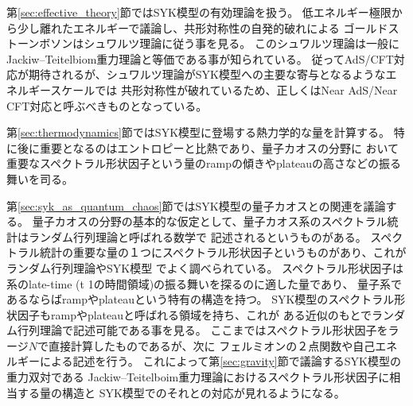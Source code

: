 第\ref{sec:effective_theory}節ではSYK模型の有効理論を扱う。
低エネルギー極限から少し離れたエネルギーで議論し、共形対称性の自発的破れによる
ゴールドストーンボソンはシュワルツ理論に従う事を見る。
このシュワルツ理論は一般にJackiw--Teitelbiom重力理論と等価である事が知られている。
従ってAdS/CFT対応が期待されるが、シュワルツ理論がSYK模型への主要な寄与となるようなエネルギースケールでは
共形対称性が破れているため、正しくはNear AdS/Near CFT対応と呼ぶべきものとなっている。

第\ref{sec:thermodynamics}節ではSYK模型に登場する熱力学的な量を計算する。
特に後に重要となるのはエントロピーと比熱であり、量子カオスの分野に
おいて重要なスペクトラル形状因子という量のrampの傾きやplateauの高さなどの振る舞いを司る。

第\ref{sec:syk_as_quantum_chaos}節ではSYK模型の量子カオスとの関連を議論する。
量子カオスの分野の基本的な仮定として、量子カオス系のスペクトラル統計はランダム行列理論と呼ばれる数学で
記述されるというものがある。
スペクトラル統計の重要な量の１つにスペクトラル形状因子というものがあり、これがランダム行列理論やSYK模型
でよく調べられている。
スペクトラル形状因子は系のlate-time (t \gg 1の時間領域)の振る舞いを探るのに適した量であり、
量子系であるならばrampやplateauという特有の構造を持つ。
SYK模型のスペクトラル形状因子もrampやplateauと呼ばれる領域を持ち、これが
ある近似のもとでランダム行列理論で記述可能である事を見る。
ここまではスペクトラル形状因子をラージ$N$で直接計算したものであるが、次に
フェルミオンの２点関数や自己エネルギーによる記述を行う。
これによって第\ref{sec:gravity}節で議論するSYK模型の重力双対である
Jackiw--Teitelboim重力理論におけるスペクトラル形状因子に相当する量の構造と
SYK模型でのそれとの対応が見れるようになる。

\pagebreak
